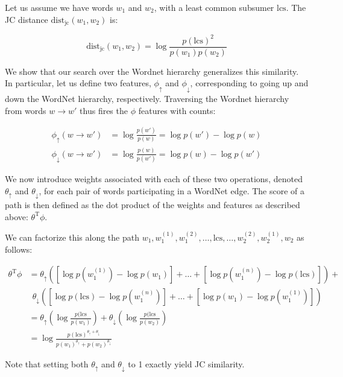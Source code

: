 Let us assume we have words $w_1$ and $w_2$, with a least common subsumer $\textrm{lcs}$.
The JC distance $\textrm{dist}_{\textrm{jc}}(w_1, w_2)$ is:

\begin{equation}
\textrm{dist}_{\textrm{jc}}(w_1, w_2)
  = \log\frac{p(\textrm{lcs})^2}{p(w_1)p(w_2)}
\end{equation}

We show that our search over the Wordnet hierarchy generalizes this similarity.
In particular, let us define two features, $\phi_\uparrow$ and $\phi_\downarrow$,
  corresponding to going up and down the WordNet hierarchy, respectively.
Traversing the Wordnet hierarchy from words $w \rightarrow w'$ thus fires the $\phi$
  features with counts:

\begin{align}
  \phi_\uparrow(w \rightarrow w')
    &= \log\frac{p(w')}{p(w)} = \log p(w') - \log p(w) \\
  \phi_\downarrow(w \rightarrow w')
    &= \log\frac{p(w)}{p(w')} = \log p(w) - \log p(w') 
\end{align}

We now introduce weights associated with each of these two operations, denoted
  $\theta_\uparrow$ and $\theta_\downarrow$, for each pair of words participating
  in a WordNet edge.
The score of a path is then defined as the dot product of the weights and features
  as described above: $\theta^{\textrm{T}}\phi$.

We can factorize this along the path
  $w_1, w_1^{(1)}, w_1^{(2)}, \dots, \textrm{lcs}, \dots, w_2^{(2)},  w_2^{(1)}, w_2$
  as follows:

\begin{align*}
\theta^{\textrm{T}}\phi
  &= \theta_\uparrow \left( 
    \left[\log p(w_1^{(1)}) - \log p(w_1)\right] +
    \dots +
    \left[\log p(w_1^{(n)}) - \log p(\textrm{lcs})\right]
    \right) + \\
  &~~ \theta_\downarrow \left( 
    \left[\log p(\textrm{lcs}) - \log p(w_1^{(n)}) \right] +
    \dots +
    \left[\log p(w_1) - \log p(w_1^{(1)})\right]
    \right) \\
  &= \theta_\uparrow \left( \log \frac{p(\textrm{lcs}}{p(w_1)} \right) +
     \theta_\downarrow \left( \log \frac{p(\textrm{lcs}}{p(w_2)} \right) \\
  &= \log \frac{ p(\textrm{lcs})^{\theta_\uparrow + \theta_\downarrow} }
               { p(w_1)^{\theta_\uparrow} + p(w_2)^{\theta_\downarrow} }
\end{align*}

Note that setting both $\theta_\uparrow$ and $\theta_\downarrow$ to 1 exactly
  yield JC similarity.
